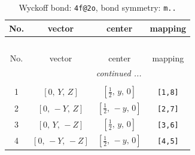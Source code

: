 \documentclass[fleqn,8pt]{jsarticle}
\begin{document}
\renewcommand{\arraystretch}{1.2}
\begin{longtable}{cccc}
\caption{Wyckoff bond: {\tt 4f@2o}, bond symmetry: {\tt m..}}
 \\
 \hline \hline
No. & vector & center & mapping \\ \hline \endfirsthead

\multicolumn{3}{l}{\tablename\ \thetable{}} \\
 \hline \hline
No. & vector & center & mapping \\ \hline \endhead

 \hline \hline
\multicolumn{3}{r}{\footnotesize\it continued ...} \\ \endfoot

 \hline \hline
\multicolumn{3}{r}{} \\ \endlastfoot

1 & $\left[ 0,\, Y,\, Z \right]$ & $\left[ \frac{1}{2},\, y,\, 0 \right]$ & {\tt [1,8]} \\ \hline
2 & $\left[ 0,\, - Y,\, Z \right]$ & $\left[ \frac{1}{2},\, - y,\, 0 \right]$ & {\tt [2,7]} \\ \hline
3 & $\left[ 0,\, Y,\, - Z \right]$ & $\left[ \frac{1}{2},\, y,\, 0 \right]$ & {\tt [3,6]} \\ \hline
4 & $\left[ 0,\, - Y,\, - Z \right]$ & $\left[ \frac{1}{2},\, - y,\, 0 \right]$ & {\tt [4,5]} \\
\end{longtable}
\renewcommand{\arraystretch}{1.2}
\end{document}
